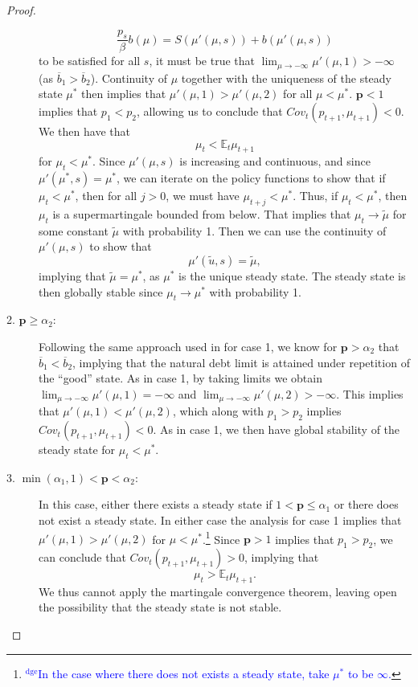 \documentclass[12pt]{article}
\newcommand{\dge}[1]{\textcolor{blue}{$^{\textrm{dge}}${#1}}}
\newcommand{\apb}[1]{\textcolor{magenta}{$^{\textrm{apb}}${#1}}}
\newcommand{\EE}{\mathbb E}
\begin{document}
\begin{proof}
\begin{description}
	\[
		\frac{p_s}{\beta}b(\mu) = S(\mu'(\mu,s))+b(\mu'(\mu,s))
	\] to be satisfied for all $s$, it must be true that $\lim_{\mu\rightarrow -\infty} \mu'(\mu,1) >-\infty$ (as $\overline b_1 > \overline b_2$).  Continuity of $\mu$ together with the uniqueness of the steady state $\mu^*$ then implies that $\mu'(\mu,1) > \mu'(\mu,2)$ for all $\mu < \mu^*$.
	$\bm p < 1$ implies that $p_1 < p_2$, allowing us to conclude that $Cov_t(p_{t+1},\mu_{t+1}) < 0$.  We then have that
	\[
		\mu_t < \EE_t\mu_{t+1}
	\] for $\mu_t < \mu^*$.  Since $\mu'(\mu,s)$ is increasing and  continuous, and since $\mu'(\mu^*,s) = \mu^*$, we can iterate on the policy functions to show that if $\mu_t < \mu^*$, then for all $j> 0$, we must have $\mu_{t+j} <\mu^*$.  Thus, if $\mu_t <\mu^*$, then $\mu_t$ is a supermartingale bounded from below. That implies  that $\mu_t\rightarrow \tilde\mu$ for some constant $\tilde\mu$ with probability 1.  Then  we
can use  the continuity of $\mu'(\mu,s)$ to show that
	\[
		\mu'(\tilde u,s) = \tilde \mu,
	\] implying that $\tilde \mu =\mu^*$, as $\mu^*$ is the unique steady state.  The steady state is then globally stable since $\mu_t \rightarrow \mu^*$ with probability 1.
	\item[2. $\bm p \geq \alpha_2$:]  Following the same approach used  in for case 1, we know for $\bm p > \alpha_2$ that $\overline b_1 < \overline b_2$, implying that the natural debt limit is attained under repetition of  the ``good'' state.  As in case 1,  by taking limits we obtain $\lim_{\mu\rightarrow-\infty} \mu'(\mu,1) = -\infty$ and $\lim_{\mu\rightarrow-\infty}\mu'(\mu,2) > -\infty$.  This implies that $\mu'(\mu,1) < \mu'(\mu,2)$, which along with $p_1 > p_2$ implies $Cov_t(p_{t+1},\mu_{t+1}) <0$.  As in case 1, we then have global stability of the steady state for $\mu_t < \mu^*$.
	\item[3. $\min(\alpha_1,1) < \bm p < \alpha_2$:]   In this case, either there exists a steady state if $1 < \bm p \leq \alpha_1$ or there does not exist a steady state.  In either case the analysis for case 1 implies that $\mu'(\mu,1) > \mu'(\mu,2)$ for $\mu < \mu ^*$.\footnote{\dge{In the case where there does not exists a steady state, take $\mu^*$ to be $\infty$.}}  Since $\bm p >1$ implies that $p_1 > p_2$, we can  conclude that $Cov_t(p_{t+1},\mu_{t+1}) > 0$, implying that
	\[
		\mu_t > \EE_t \mu_{t+1}.
	\]We thus cannot apply the martingale convergence theorem, leaving open the possibility that the steady state is not stable.
\end{description}
\end{proof}
\end{document}
